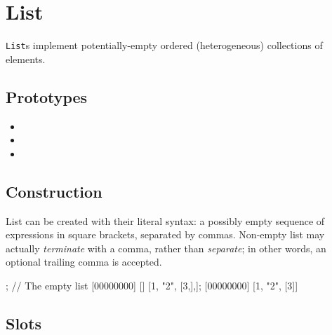 \section{List}

\lstinline|List|s implement potentially-empty ordered (heterogeneous)
collections of elements.

\subsection{Prototypes}

\begin{itemize}
\item {}
\item {}
\item {}
\end{itemize}

\subsection{Construction}

List can be created with their literal syntax: a possibly empty
sequence of expressions in square brackets, separated by commas.
Non-empty list may actually \emph{terminate} with a comma, rather than
\emph{separate}; in other words, an optional trailing comma is accepted.

\begin{urbiscript}
[]; // The empty list
[00000000] []
[1, "2", [3,],];
[00000000] [1, "2", [3]]
\end{urbiscript}

\subsection{Slots}

